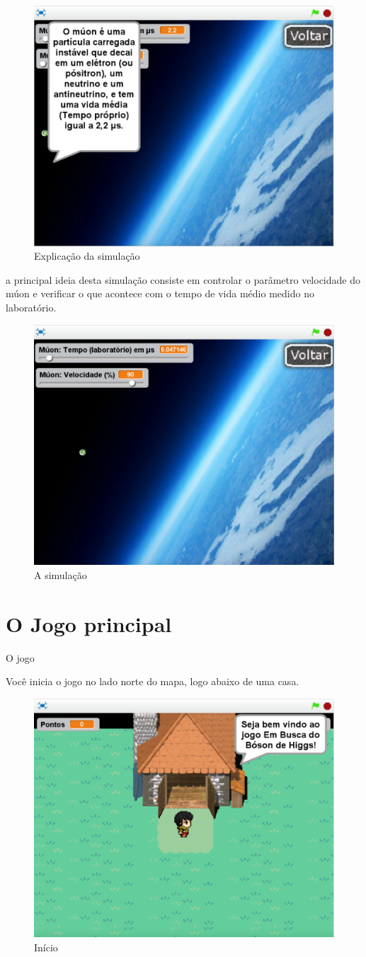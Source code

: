 \documentclass[12pt,fleqn]{book} %
\begin{document}
\begin{figure}[h]
	\centering
	\includegraphics[width=0.6 \textwidth]{Produto/sim1}
	\caption{Explicação da simulação}
	\label{fig:app_a:sim1}
\end{figure}

a principal ideia desta simulação consiste em controlar o parâmetro velocidade do múon e verificar o que acontece com o tempo de vida médio medido no laboratório.

\begin{figure}[h]
	\centering
	\includegraphics[width=0.6 \textwidth]{Produto/sim2}
	\caption{A simulação}
	\label{fig:app_a:sim2}
\end{figure}


\section{O Jogo principal}
O jogo 

Você inicia o jogo no lado norte do mapa, logo abaixo de uma casa. 

\begin{figure}[h]
	\centering
	\includegraphics[width=0.65 \textwidth]{Produto/jogo_1}
	\caption{Início}
	\label{fig:app_a:jogo1}
\end{figure}
\end{document}
